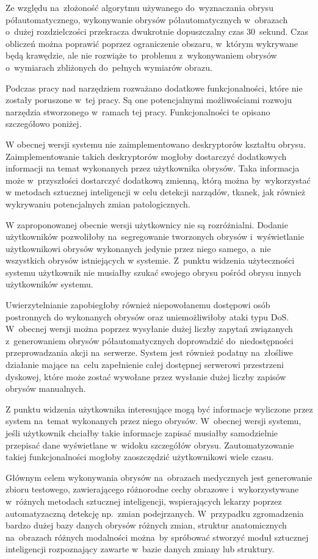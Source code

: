\documentclass[a4paper,11pt,twoside,openright]{report}
\theoremstyle{definition}
\begin{document}
Ze względu na~złożoność algorytmu używanego do~wyznaczania obrysu półautomatycznego,
wykonywanie obrysów półautomatycznych w~obrazach o~dużej rozdzielczości przekracza
dwukrotnie dopuszczalny czas 30~sekund. Czas
obliczeń można poprawić poprzez ograniczenie obszaru, w~którym wykrywane będą
krawędzie, ale nie rozwiąże to~problemu z~wykonywaniem obrysów o~wymiarach
zbliżonych do~pełnych wymiarów obrazu.

Podczas pracy nad narzędziem rozważano dodatkowe funkcjonalności, które nie zostały
poruszone w~tej pracy. Są one potencjalnymi możliwościami rozwoju narzędzia
stworzonego w~ramach tej pracy. Funkcjonalności te opisano szczegółowo poniżej.

W obecnej wersji systemu nie zaimplementowano deskryptorów kształtu obrysu.
Zaimplementowanie takich deskryptorów mogłoby dostarczyć dodatkowych informacji
na temat wykonanych przez użytkownika obrysów. Taka informacja może w~przyszłości
dostarczyć dodatkową zmienną, którą można by~wykorzystać w metodach sztucznej
inteligencji w celu detekcji narządów, tkanek, jak również wykrywaniu potencjalnych zmian patologicznych.

W zaproponowanej obecnie wersji użytkownicy nie są rozróżnialni. Dodanie użytkowników
pozwoliłoby na~segregowanie tworzonych obrysów i~wyświetlanie użytkownikowi
obrysów wykonanych jedynie przez niego samego, a~nie wszystkich obrysów istniejących
w systemie. Z~punktu widzenia użyteczności systemu użytkownik nie musiałby szukać
swojego obrysu pośród obrysu innych użytkowników systemu.

Uwierzytelnianie zapobiegłoby również niepowołanemu dostępowi osób postronnych
do wykonanych obrysów oraz uniemożliwiłoby ataki typu DoS. W~obecnej wersji można
poprzez wysyłanie dużej liczby zapytań związanych z~generowaniem obrysów półautomatycznych
doprowadzić do~niedostępności przeprowadzania akcji na~serwerze. System jest również
podatny na~złośliwe działanie mające na~celu zapełnienie całej dostępnej serwerowi
przestrzeni dyskowej, które może zostać wywołane przez wysłanie dużej liczby
zapisów obrysów manualnych.

Z punktu widzenia użytkownika interesujące mogą być informacje wyliczone przez
system na~temat wykonanych przez niego obrysów. W~obecnej wersji systemu, jeśli
użytkownik chciałby takie informacje zapisać musiałby samodzielnie przepisać dane
wyświetlane w~widoku szczegółów obrysu. Zautomatyzowanie takiej funkcjonalności
mogłoby zaoszczędzić użytkownikowi wiele czasu.

Głównym celem wykonywania obrysów na~obrazach medycznych jest generowanie zbioru
testowego, zawierającego różnorodne cechy obrazowe i~wykorzystywane w~różnych
metodach sztucznej inteligencji, wspierających lekarzy poprzez automatyzaczną
detekcję np.~zmian podejrzanych. W~przypadku zgromadzenia bardzo dużej bazy danych
obrysów różnych zmian, struktur anatomicznych na~obrazach różnych modalności można~by
spróbować stworzyć moduł sztucznej inteligencji rozpoznający zawarte w~bazie danych zmiany lub struktury.
\end{document}
